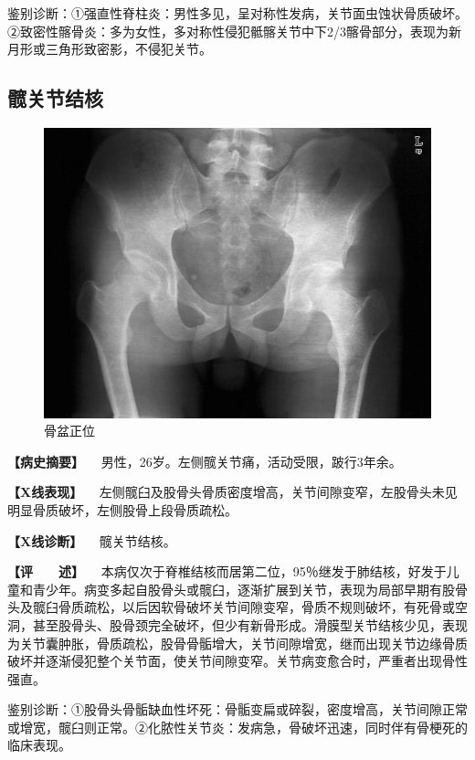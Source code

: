 鉴别诊断：①强直性脊柱炎：男性多见，呈对称性发病，关节面虫蚀状骨质破坏。②致密性髂骨炎：多为女性，多对称性侵犯骶髂关节中下2/3髂骨部分，表现为新月形或三角形致密影，不侵犯关节。

\subsection{髋关节结核}

\begin{figure}[!htbp]
 \centering
 \includegraphics{./images/Image00081.jpg}
 \captionsetup{justification=centering}
 \caption{骨盆正位}
 \label{fig2-6-6}
  \end{figure} 

\textbf{【病史摘要】} 　男性，26岁。左侧髋关节痛，活动受限，跛行3年余。

\textbf{【X线表现】}
　左侧髋臼及股骨头骨质密度增高，关节间隙变窄，左股骨头未见明显骨质破坏，左侧股骨上段骨质疏松。

\textbf{【X线诊断】} 　髋关节结核。

\textbf{【评　　述】}
　本病仅次于脊椎结核而居第二位，95％继发于肺结核，好发于儿童和青少年。病变多起自股骨头或髋臼，逐渐扩展到关节，表现为局部早期有股骨头及髋臼骨质疏松，以后因软骨破坏关节间隙变窄，骨质不规则破坏，有死骨或空洞，甚至股骨头、股骨颈完全破坏，但少有新骨形成。滑膜型关节结核少见，表现为关节囊肿胀，骨质疏松，股骨骨骺增大，关节间隙增宽，继而出现关节边缘骨质破坏并逐渐侵犯整个关节面，使关节间隙变窄。关节病变愈合时，严重者出现骨性强直。

鉴别诊断：①股骨头骨骺缺血性坏死：骨骺变扁或碎裂，密度增高，关节间隙正常或增宽，髋臼则正常。②化脓性关节炎：发病急，骨破坏迅速，同时伴有骨梗死的临床表现。

